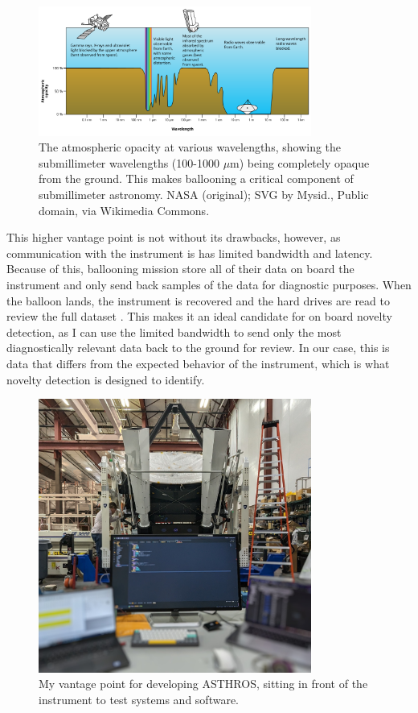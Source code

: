 \begin{figure}
\centering
\includegraphics[width=0.8\textwidth]{figs/intro/atmosphere.png}
\caption[Atmospheric Opacity at Various Wavelengths]{
    The atmospheric opacity at various wavelengths, showing the submillimeter wavelengths (100-1000 $\mu$m) being completely opaque from the ground.
    This makes ballooning a critical component of submillimeter astronomy. NASA (original); SVG by Mysid., Public domain, via Wikimedia Commons.
    \label{intro/fig:atmosphere}
}
\end{figure}

This higher vantage point is not without its drawbacks, however, as communication with the instrument is has limited bandwidth and latency. 
Because of this, ballooning mission store all of their data on board the instrument and only send back samples of the data for diagnostic purposes.
When the balloon lands, the instrument is recovered and the hard drives are read to review the full dataset \parencite{walker_STO}.
This makes it an ideal candidate for on board novelty detection, as I can use the limited bandwidth to send only the most diagnostically relevant data back to the ground for review.
In our case, this is data that differs from the expected behavior of the instrument, which is what novelty detection is designed to identify.

\begin{figure}
\centering
\includegraphics[width=0.8\textwidth]{figs/intro/asthros_instrument.jpg}
\caption[Command Station for Software Development of ASTHROS]{
    My vantage point for developing ASTHROS, sitting in front of the instrument to test systems and software.
}
\label{intro/fig:asthros_instrument}
\end{figure}

